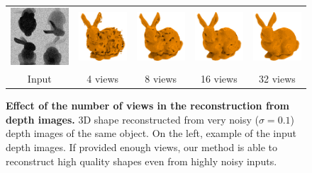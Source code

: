\begin{figure}[t]
\centering
\setlength{\tabcolsep}{0pt}
\begin{tabular}{ccccc}
\includegraphics[width=.2\linewidth]{dsp/figs/depthinput.pdf} &
\includegraphics[width=.2\linewidth]{dsp/figs/bunny_deep_4depth_01noise.png} &
\includegraphics[width=.2\linewidth]{dsp/figs/bunny_deep_8depth_01noise.png} &
\includegraphics[width=.2\linewidth]{dsp/figs/bunny_deep_16depth_01noise.png} &
\includegraphics[width=.2\linewidth]{dsp/figs/bunny_deep_32depth_01noise.png}\\
Input&
4 views &
8 views&
16 views&
32 views
\end{tabular}
	\caption{\small \label{fig:depthview} \textbf{Effect of the number of views in the reconstruction from depth images.}
		3D shape reconstructed from very noisy ($\sigma=0.1$) depth images of the same object.
		On the left, example of the input depth images.
		If provided enough views, our method is able to reconstruct high quality shapes even from highly noisy
		inputs.
    }
\end{figure}

